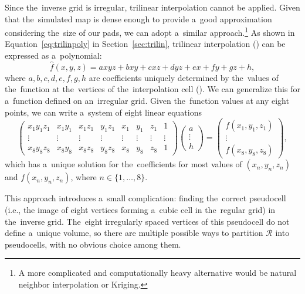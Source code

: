 			Since the~inverse grid is irregular, trilinear interpolation cannot be applied. Given that the~simulated map is dense enough to provide a~good approximation considering the~size of our pads, we can adopt a~similar approach.\footnote{A more complicated and computationally heavy alternative would be natural neighbor interpolation or Kriging.} As shown in Equation~\ref{eq:trilinpoly} in Section~\ref{sec:trilin}, trilinear interpolation () can be expressed as a~polynomial:
				\begin{equation}
					\widehat{f}(x,y,z) = axyz + bxy + cxz + dyz + ex + fy + gz + h,
				\end{equation}
			where $a,b,c,d,e,f,g,h$ are coefficients uniquely determined by the~values of the~function at the~vertices of the~interpolation cell (). We can generalize this for a~function defined on an~irregular grid. Given the~function values at any eight points, we can write a~system of eight linear equations
				\begin{equation}
					\begin{pmatrix}
						x_1 y_1 z_1 & x_1 y_1 & x_1 z_1 & y_1 z_1 & x_1 & y_1 & z_1 & 1\\
						\vdots & \vdots & \vdots & \vdots & \vdots & \vdots & \vdots & \vdots\\
						x_8 y_8 z_8 & x_8 y_8 & x_8 z_8 & y_8 z_8 & x_8 & y_8 & z_8 & 1
					\end{pmatrix}
					\begin{pmatrix}
						a\\
						\vdots\\
						h
					\end{pmatrix}
					=
					\begin{pmatrix}
						f(x_1,y_1,z_1)\\
						\vdots\\
						f(x_8,y_8,z_8)
					\end{pmatrix},
				\end{equation}
			which has a~unique solution for the~coefficients for most values of $(x_n, y_n, z_n)$ and $f(x_n,y_n,z_n)$, where $n\in\{1,\ldots,8\}$.
			
			This approach introduces a~small complication: finding the~correct pseudocell (i.e., the image of eight vertices forming a~cubic cell in the~regular grid) in the~inverse grid. The~eight irregularly spaced vertices of this pseudocell do not define a~unique volume, so there are multiple possible ways to partition $\mathcal{R}$ into pseudocells, with no obvious choice among them.
			
